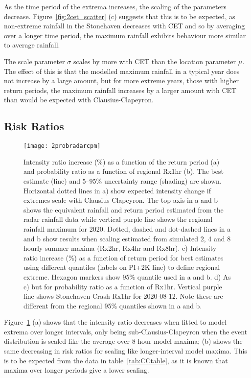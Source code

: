 As the time period of the extrema increases,
    the scaling of the parameters decrease.
Figure~\ref{fig:2cet_scatter} (c) suggests that this is to be expected,
    as non-extreme rainfall in the Stonehaven decreases with CET and so by averaging over a longer time period,
    the maximum rainfall exhibits behaviour more similar to average rainfall.

The scale parameter $\sigma$ scales by more with CET than the location parameter $\mu$.
The effect of this is that the modelled maximum rainfall in a typical year does not increase by a large amount,
    but for more extreme years, those with higher return periods,
    the maximum rainfall increases by a larger amount with CET than would be expected with Clausius-Clapeyron.

\subsection{Risk Ratios}\label{subsec:riskratio}

\begin{figure}[H]
    \centering
    \texttt{[image: 2probradarcpm]}
    \caption{Intensity ratio increase (\%) as a function of the return period (a) and
    probability ratio as a function of regional Rx1hr (b).
    The best estimate (line) and 5--95\% uncertainty range (shading) are shown.
    Horizontal dotted lines in a) show expected intensity change if extremes scale with Clausius-Clapeyron.
    The top axis in a and b shows the equivalent rainfall and return period estimated from the radar rainfall data while
    vertical purple line shows the regional rainfall maximum for 2020.
    Dotted, dashed and dot-dashed lines in a and b show results when scaling estimated from simulated 2, 4 and 8 hourly summer maxima (Rx2hr, Rx4hr and Rx8hr).
    c) Intensity ratio increase (\%) as a function of return period for best estimates using different quantiles (labels on PI+2K line) to define regional extreme.
    Hexagon markers show 95\% quantile used in a and b.
    d) As c) but for probability ratio as a function of Rx1hr.
    Vertical purple line shows Stonehaven Crash Rx1hr for 2020-08-12.
    Note these are different from the regional 95\% quantiles shown in a and b.}
    \label{fig:2probradarcpm}
\end{figure}

Figure~\ref{fig:2probradarcpm} (a) shows that the intensity ratio decreases when fitted to model extrema over longer intervals,
    only being sub-Clausius-Clapeyron when the event distribution is scaled like the average over 8 hour model maxima;
(b) shows the same decreasing in risk ratios for scaling like longer-interval model maxima.
This is to be expected from the data in table~\ref{tab:CCtable},
    as it is known that maxima over longer periods give a lower scaling.

